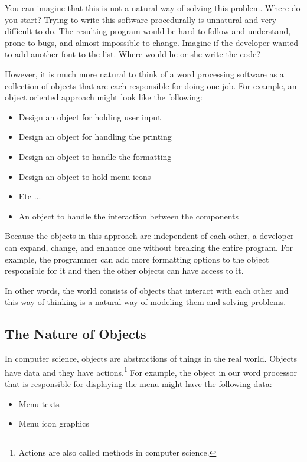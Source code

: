 You can imagine that this is not a natural way of solving this problem. Where do you start? Trying to write this software procedurally is unnatural and very difficult to do. The resulting program would be hard to follow and understand, prone to bugs, and almost impossible to change. Imagine if the developer wanted to add another font to the list. Where would he or she write the code? 

However, it is much more natural to think of a word processing software as a collection of objects that are each responsible for doing one job. For example, an object oriented approach might look like the following:
\begin{itemize}
	\item Design an object for holding user input
	\item Design an object for handling the printing
	\item Design an object to handle the formatting
	\item Design an object to hold menu icons
	\item Etc ...
	\item An object to handle the interaction between the components
\end{itemize}

Because the objects in this approach are independent of each other, a developer can expand, change, and enhance one without breaking the entire program. For example, the programmer can add more formatting options to the object responsible for it and then the other objects can have access to it.

In other words, the world consists of objects that interact with each other and this way of thinking is a natural way of modeling them and solving problems.

\subsection{The Nature of Objects}
In computer science, objects are abstractions of things in the real world. Objects have data and they have actions.\footnote{Actions are also called methods in computer science.} For example, the object in our word processor that is responsible for displaying the menu might have the following data:
\begin{itemize}
	\item Menu texts
	\item Menu icon graphics
\end{itemize}

